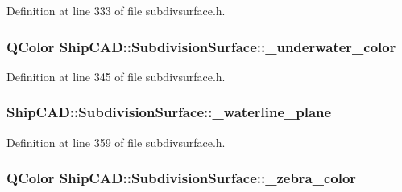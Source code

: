 Definition at line 333 of file subdivsurface.\-h.

\hypertarget{classShipCAD_1_1SubdivisionSurface_a8a64eabb53fa0facaa6e59579305328b}{
\subsubsection[{\-\_\-underwater\-\_\-color}]{\setlength{\rightskip}{0pt plus 5cm}Q\-Color Ship\-C\-A\-D\-::\-Subdivision\-Surface\-::\-\_\-underwater\-\_\-color\hspace{0.3cm}{\ttfamily [protected]}}}\label{classShipCAD_1_1SubdivisionSurface_a8a64eabb53fa0facaa6e59579305328b}


Definition at line 345 of file subdivsurface.\-h.

\hypertarget{classShipCAD_1_1SubdivisionSurface_a762de21a330588c7bfbe081637cab2f3}{
\subsubsection[{\-\_\-waterline\-\_\-plane}]{ Ship\-C\-A\-D\-::\-Subdivision\-Surface\-::\-\_\-waterline\-\_\-plane\hspace{0.3cm}{\ttfamily [protected]}}}\label{classShipCAD_1_1SubdivisionSurface_a762de21a330588c7bfbe081637cab2f3}


Definition at line 359 of file subdivsurface.\-h.

\hypertarget{classShipCAD_1_1SubdivisionSurface_a047d5d0575c944d216ada589e30ee3bd}{
\subsubsection[{\-\_\-zebra\-\_\-color}]{\setlength{\rightskip}{0pt plus 5cm}Q\-Color Ship\-C\-A\-D\-::\-Subdivision\-Surface\-::\-\_\-zebra\-\_\-color\hspace{0.3cm}{\ttfamily [protected]}}}\label{classShipCAD_1_1SubdivisionSurface_a047d5d0575c944d216ada589e30ee3bd}


